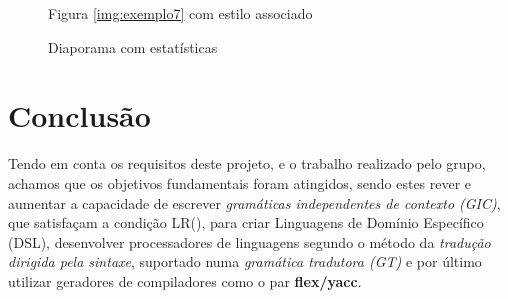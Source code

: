 \documentclass[11pt,a4paper]{report}
\begin{document}
\begin{figure}[H]
\centering
{}
\caption{Figura \ref{img:exemplo7} com estilo associado}
\label{img:exemplo8}
\end{figure}

\begin{figure}[H]
\centering
{}
\caption{Diaporama com estatísticas}
\label{img:exemplo9}
\end{figure}

\chapter{Conclusão}
\label{chap:concl}

Tendo em conta os requisitos deste projeto, e o trabalho realizado pelo grupo, achamos que os objetivos fundamentais foram atingidos, sendo estes rever e aumentar a capacidade de escrever \textit{gramáticas independentes de contexto (GIC)}, que satisfaçam a condição LR(), para criar Linguagens de Domínio Específico (DSL), desenvolver processadores de linguagens segundo o método da \textit{tradução dirigida pela sintaxe}, suportado numa \textit{gramática tradutora (GT)} e por último utilizar geradores de compiladores como o par \textbf{flex/yacc}.
\end{document}
